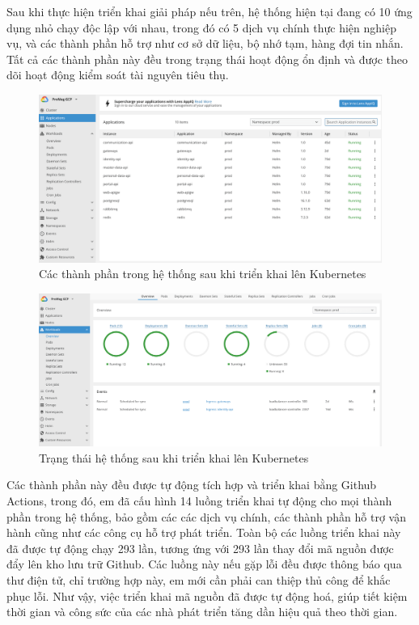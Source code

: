 \documentclass[../DoAn.tex]{subfiles}
\begin{document}
Sau khi thực hiện triển khai giải pháp nếu trên, hệ thống hiện tại đang có 10 ứng dụng nhỏ chạy độc lập với nhau, trong đó có 5 dịch vụ chính thực hiện nghiệp vụ,
và các thành phần hỗ trợ như cơ sở dữ liệu, bộ nhớ tạm, hàng đợi tin nhắn. Tất cả các thành phần này đều trong trạng thái hoạt động ổn định và được theo dõi hoạt động
kiểm soát tài nguyên tiêu thụ.

\begin{figure}[H]
    \centering
    \includegraphics[width=1.0\linewidth]{Hinhve/Result_Lens.png}
    \caption{Các thành phần trong hệ thống sau khi triển khai lên Kubernetes}
    \label{fig:Result_Lens}
\end{figure}

\begin{figure}[H]
    \centering
    \includegraphics[width=1.0\linewidth]{Hinhve/Result_Lens_Status.png}
    \caption{Trạng thái hệ thống sau khi triển khai lên Kubernetes}
    \label{fig:Result_Lens_Status}
\end{figure}

\newpage

Các thành phần này đều được tự động tích hợp và triển khai bằng Github Actions, trong đó, em đã cấu hình 14 luồng triển khai tự động cho mọi thành phần trong hệ thống,
bảo gồm các các dịch vụ chính, các thành phần hỗ trợ vận hành cũng như các công cụ hỗ trợ phát triển. Toàn bộ các luồng triển khai này đã được tự động chạy 293 lần,
tương ứng với 293 lần thay đổi mã nguồn được đẩy lên kho lưu trữ Github. Các luồng này nếu gặp lỗi đều được thông báo qua thư điện tử, chỉ trường hợp này,
em mới cần phải can thiệp thủ công để khắc phục lỗi. Như vậy, việc triển khai mã nguồn đã được tự động hoá, giúp tiết kiệm thời gian và công sức của các nhà phát triển
tăng dần hiệu quả theo thời gian.
\end{document}
